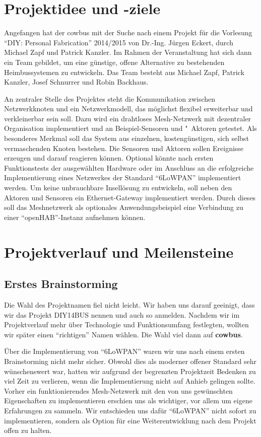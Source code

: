 \documentclass{IEEEtran}
\begin{document}
\section{Projektidee und -ziele}
    Angefangen hat der cowbus mit der Suche nach einem Projekt für die Vorlesung 
    \enquote{DIY: Personal Fabrication} 2014/2015 von Dr.-Ing. Jürgen Eckert, durch 
    Michael Zapf und Patrick Kanzler. Im Rahmen der Veranstaltung hat sich dann ein 
    Team gebildet, um eine günstige, offene Alternative zu bestehenden Heimbussystemen 
    zu entwickeln. Das Team besteht aus Michael Zapf, Patrick Kanzler, Josef Schnurrer 
    und Robin Backhaus. 

    An zentraler Stelle des Projektes steht die Kommunikation zwischen Netzwerkknoten 
    und ein Netzwerkmodell, das möglichst flexibel erweiterbar und verkleinerbar 
    sein soll. 
    Dazu wird ein drahtloses Mesh-Netzwerk mit dezentraler Organisation implementiert 
    und an Beispiel-Sensoren und "~Aktoren getestet. 
    Als besonderes Merkmal soll das System aus einzelnen, kostengünstigen, sich 
    selbst vermaschenden Knoten bestehen.
    Die Sensoren und Aktoren sollen Ereignisse erzeugen und darauf reagieren können. 
    Optional könnte nach ersten Funktionstests der ausgewählten Hardware oder im 
    Anschluss an die erfolgreiche Implementierung eines Netzwerkes der Standard 
    \enquote{\ac{6LoWPAN}} implementiert werden. 
    Um keine unbrauchbare Insellösung zu entwickeln, soll neben den Aktoren und 
    Sensoren ein Ethernet-Gateway implementiert werden. Durch dieses soll das 
    Meshnetzwerk als optionales Anwendungsbeispiel eine Verbindung zu 
    einer \enquote{\ac{openHAB}}-Instanz aufnehmen können.


\section{Projektverlauf und Meilensteine}
    \subsection{Erstes Brainstorming}
    Die Wahl des Projektnamen fiel nicht leicht. Wir haben uns darauf geeinigt, dass 
    wir das Projekt DIY14BUS nennen und auch so anmelden. Nachdem wir im 
    Projektverlauf mehr über Technologie und Funktionsumfang festlegten, wollten wir 
    später einen \enquote{richtigen} Namen wählen. Die Wahl viel dann auf \textbf{cowbus}.

    Über die Implementierung von \enquote{\ac{6LoWPAN}} waren wir uns nach einem ersten 
    Brainstorming nicht mehr sicher. Obwohl dies als moderner offener Standard 
    sehr wünschenswert war, hatten wir aufgrund der begrenzten Projektzeit Bedenken 
    zu viel Zeit zu verlieren, wenn die Implementierung nicht auf Anhieb gelingen 
    sollte. Vorher ein funktionierendes Mesh-Netzwerk mit den von uns gewünschten 
    Eigenschaften zu implementieren erschien uns als wichtiger, vor allem um 
    eigene Erfahrungen zu sammeln. Wir entschieden uns dafür \enquote{\ac{6LoWPAN}} 
    nicht sofort zu implementieren, sondern als Option für eine Weiterentwicklung 
    nach dem Projekt offen zu halten.
\end{document}
